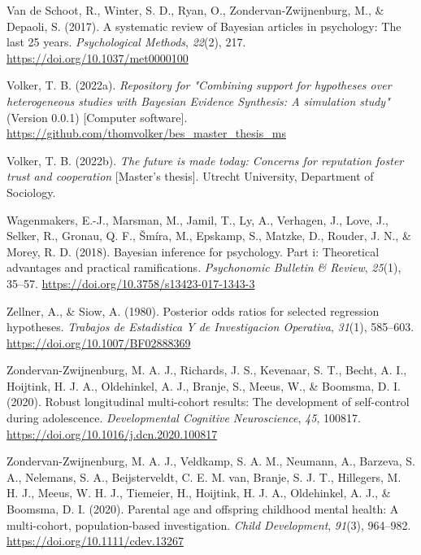 \documentclass[
]{interact}
\newlength{\cslhangindent}
\newlength{\cslentryspacingunit} %
\newenvironment{CSLReferences}[2] %
    {%
  \setlength{\parindent}{0pt}
  \ifodd #1
  \let\oldpar\par
  \def\par{\hangindent=\cslhangindent\oldpar}
  \fi
  \setlength{\parskip}{#2\cslentryspacingunit}
 }%
 {}
\begin{document}
\begin{CSLReferences}{1}{0}
                    \leavevmode{}%
                    Van de Schoot, R., Winter, S. D., Ryan, O., Zondervan-Zwijnenburg, M.,
                    \& Depaoli, S. (2017). A systematic review of {B}ayesian articles in
                    psychology: The last 25 years. \emph{Psychological Methods},
                    \emph{22}(2), 217. \url{https://doi.org/10.1037/met0000100}
                    
                    \leavevmode{}%
                    Volker, T. B. (2022a). \emph{{Repository for "Combining support for
hypotheses over heterogeneous studies with Bayesian Evidence Synthesis:
A simulation study"}} (Version 0.0.1) {[}Computer software{]}.
                    \url{https://github.com/thomvolker/bes_master_thesis_ms}
                    
                    \leavevmode{}%
                    Volker, T. B. (2022b). \emph{The future is made today: Concerns for
                      reputation foster trust and cooperation} {[}Master's thesis{]}. Utrecht
University, Department of Sociology.

\leavevmode{}%
Wagenmakers, E.-J., Marsman, M., Jamil, T., Ly, A., Verhagen, J., Love,
J., Selker, R., Gronau, Q. F., Šmíra, M., Epskamp, S., Matzke, D.,
Rouder, J. N., \& Morey, R. D. (2018). Bayesian inference for
psychology. Part i: Theoretical advantages and practical ramifications.
\emph{Psychonomic Bulletin {\&} Review}, \emph{25}(1), 35--57.
\url{https://doi.org/10.3758/s13423-017-1343-3}

\leavevmode{}%
Zellner, A., \& Siow, A. (1980). Posterior odds ratios for selected
regression hypotheses. \emph{Trabajos de Estadistica Y de Investigacion
Operativa}, \emph{31}(1), 585--603.
\url{https://doi.org/10.1007/BF02888369}

\leavevmode{}%
Zondervan-Zwijnenburg, M. A. J., Richards, J. S., Kevenaar, S. T.,
Becht, A. I., Hoijtink, H. J. A., Oldehinkel, A. J., Branje, S., Meeus,
W., \& Boomsma, D. I. (2020). Robust longitudinal multi-cohort results:
The development of self-control during adolescence. \emph{Developmental
Cognitive Neuroscience}, \emph{45}, 100817.
\url{https://doi.org/10.1016/j.dcn.2020.100817}

\leavevmode{}%
Zondervan-Zwijnenburg, M. A. J., Veldkamp, S. A. M., Neumann, A.,
Barzeva, S. A., Nelemans, S. A., Beijsterveldt, C. E. M. van, Branje, S.
J. T., Hillegers, M. H. J., Meeus, W. H. J., Tiemeier, H., Hoijtink, H.
J. A., Oldehinkel, A. J., \& Boomsma, D. I. (2020). Parental age and
offspring childhood mental health: A multi-cohort, population-based
investigation. \emph{Child Development}, \emph{91}(3), 964--982.
\url{https://doi.org/10.1111/cdev.13267}

\end{CSLReferences}
\end{document}
